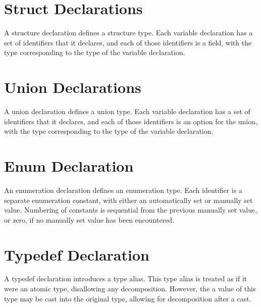 \documentclass[letterpaper,12pt]{book}
\begin{document}
\section{Struct Declarations}



A structure declaration defines a structure type. Each variable declaration has a set of identifiers that it declares, and each of those identifiers is a field, with the type corresponding to the type of the variable declaration.

\section{Union Declarations}



A union declaration defines a union type. Each variable declaration has a set of identifiers that it declares, and each of those identifiers is an option for the union, with the type corresponding to the type of the variable declaration.

\section{Enum Declaration}



An enumeration declaration defines an enumeration type. Each identifier is a separate enumeration constant, with either an automatically set or manually set value. Numbering of constants is sequential from the previous manually set value, or zero, if no manually set value has been encountered.

\section{Typedef Declaration}



A typedef declaration introduces a type alias. This type alias is treated as if it were an atomic type, disallowing any decomposition. However, the a value of this type may be cast into the original type, allowing for decomposition after a cast.
\end{document}
